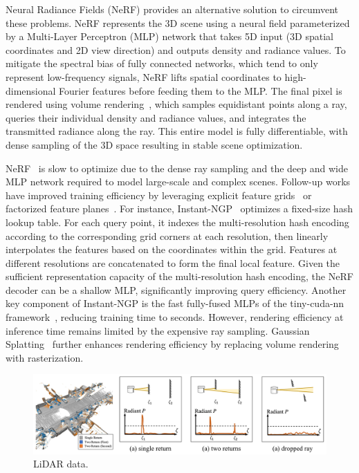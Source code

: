 Neural Radiance Fields (NeRF)\cite{mildenhall2020nerf} provides an alternative solution to circumvent these problems. NeRF represents the 3D scene using a neural field parameterized by a Multi-Layer Perceptron (MLP) network that takes 5D input (3D spatial coordinates and 2D view direction) and outputs density and radiance values. To mitigate the spectral bias\cite{tancik2020fourier} of fully connected networks, which tend to only represent low-frequency signals, NeRF lifts spatial coordinates to high-dimensional Fourier features before feeding them to the MLP. The final pixel is rendered using volume rendering~\cite{levoy1990efficient,max1995optical}, which samples equidistant points along a ray, queries their individual density and radiance values, and integrates the transmitted radiance along the ray. This entire model is fully differentiable, with dense sampling of the 3D space resulting in stable scene optimization. 

NeRF~\cite{mildenhall2020nerf} is slow to optimize due to the dense ray sampling and the deep and wide MLP network required to model large-scale and complex scenes. Follow-up works have improved training efficiency by leveraging explicit feature grids~\cite{mueller2022instant,SunSC22,fridovich2022plenoxels,yu2021plenoxels} or factorized feature planes~\cite{chen2022tensorf,kplanes_2023}. For instance, Instant-NGP~\cite{mueller2022instant} optimizes a fixed-size hash lookup table. For each query point, it indexes the multi-resolution hash encoding according to the corresponding grid corners at each resolution, then linearly interpolates the features based on the coordinates within the grid. Features at different resolutions are concatenated to form the final local feature. Given the sufficient representation capacity of the multi-resolution hash encoding, the NeRF decoder can be a shallow MLP, significantly improving query efficiency. Another key component of Instant-NGP is the fast fully-fused MLPs of the tiny-cuda-nn framework~\cite{tiny-cuda-nn}, reducing training time to seconds. However, rendering efficiency at inference time remains limited by the expensive ray sampling. Gaussian Splatting~\cite{kerbl20233d} further enhances rendering efficiency by replacing volume rendering with rasterization.


\begin{figure}[t]
    \centering
    \includegraphics[width=1.0\columnwidth]{imgs/lidar_nvs.pdf}
    \caption{LiDAR data.}
    \label{fig:3d_representation}
\end{figure}
